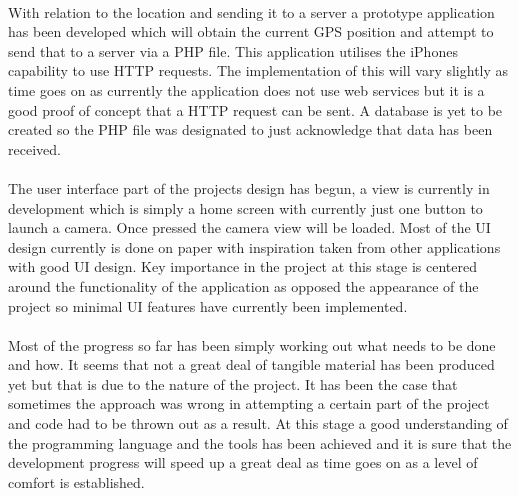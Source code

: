 \documentclass[12pt]{article}
\begin{document}
\paragraph{}
\label{par:First Paragraph}

With relation to the location and sending it to a server a prototype application has  been developed which will obtain the current GPS position and attempt to send that to a server via a PHP file. This application utilises the iPhones capability to use HTTP requests. The implementation of this will vary slightly as time goes on as currently the application does not use web services but it is a good proof of concept that a HTTP request can be sent. A database is yet to be created so the PHP file was designated to just acknowledge that data has been received.

\paragraph{}
\label{par:First Paragraph}

The user interface part of the projects design has begun, a view is currently in development which is simply a home screen with currently just one button to launch a camera. Once pressed the camera view will be loaded. Most of the UI design currently is done on paper with inspiration taken from other applications with good UI design.
Key importance in the project at this stage is centered around the functionality of the application as opposed the appearance of the project so minimal UI features have currently been implemented.

\paragraph{}
\label{par:First Paragraph}

Most of the progress so far has been simply working out what needs to be done and how. It seems that not a great deal of tangible material has been produced yet but that is due to the nature of the project. It has been the case that sometimes the approach was wrong in attempting a certain part of the project and code had to be thrown out as a result.
At this stage a good understanding of the programming language and the tools has been achieved and it is sure that the development progress will speed up a great deal as time goes on as a level of comfort is established.

\newpage

\label{sec:Objectives}
\end{document}
